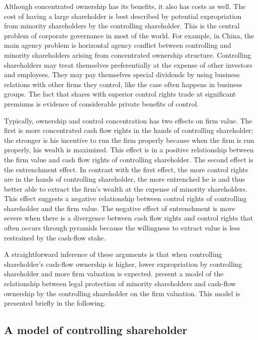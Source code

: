 \documentclass[final,1p,authoryear]{elsarticle}
\begin{document}
Although concentrated ownership has its benefits, it also has costs as well. The cost of having a large shareholder is best described by potential expropriation from minority shareholders by the controlling shareholder. This is the central problem of corporate governance in most of the world. For example, in China, the main agency problem is horizontal agency conflict between controlling and minority shareholders arising from concentrated ownership structure. Controlling shareholders may treat themselves preferentially at the expense of other investors and employees. They may pay themselves special dividends by using business relations with other firms they control, like the case often happens in business groups. The fact that shares with superior control rights trade at significant premiums is evidence of considerable private benefits of control.

Typically, ownership and control concentration has two effects on firm value. The first is more concentrated cash flow rights in the hands of controlling shareholder; the stronger is his incentive to run the firm properly because when the firm is run properly, his wealth is maximized. This effect is in a positive relationship between the firm value and cash flow rights of controlling shareholder. The second effect is the entrenchment effect. In contrast with the first effect, the more control rights are in the hands of controlling shareholder, the more entrenched he is and thus better able to extract the firm’s wealth at the expense of minority shareholders. This effect suggests a negative relationship between control rights of controlling shareholder and the firm value. The negative effect of entrenchment is more severe when there is a divergence between cash flow rights and control rights that often occurs through pyramids because the willingness to extract value is less restrained by the cash-flow stake.

A straightforward inference of these arguments is that when controlling shareholder's cash-flow ownership is higher, lower expropriation by controlling shareholder and more firm valuation is expected. \cite{doi:10.1111/1540-6261.00457} present a model of the relationship between legal protection of minority shareholders and cash-flow ownership by the controlling shareholder on the firm valuation. This model is presented briefly in the following.


\subsection{A model of controlling shareholder}
\end{document}
